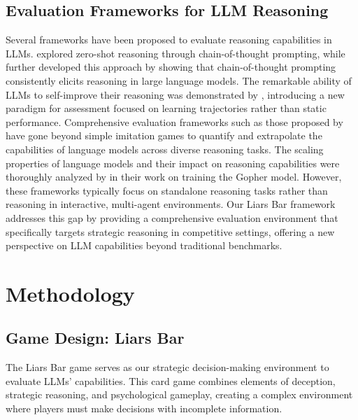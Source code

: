 \documentclass{article}
\begin{document}
\subsection{Evaluation Frameworks for LLM Reasoning}
Several frameworks have been proposed to evaluate reasoning capabilities in LLMs. \cite{kojima2022large} explored zero-shot reasoning through chain-of-thought prompting, while \cite{wei2022chain} further developed this approach by showing that chain-of-thought prompting consistently elicits reasoning in large language models. The remarkable ability of LLMs to self-improve their reasoning was demonstrated by \cite{huang2023large}, introducing a new paradigm for assessment focused on learning trajectories rather than static performance. Comprehensive evaluation frameworks such as those proposed by \cite{srivastava2022beyond} have gone beyond simple imitation games to quantify and extrapolate the capabilities of language models across diverse reasoning tasks. The scaling properties of language models and their impact on reasoning capabilities were thoroughly analyzed by \cite{rae2022scaling} in their work on training the Gopher model. However, these frameworks typically focus on standalone reasoning tasks rather than reasoning in interactive, multi-agent environments. Our Liars Bar framework addresses this gap by providing a comprehensive evaluation environment that specifically targets strategic reasoning in competitive settings, offering a new perspective on LLM capabilities beyond traditional benchmarks.

\section{Methodology}
\subsection{Game Design: Liars Bar}
The Liars Bar game serves as our strategic decision-making environment to evaluate LLMs' capabilities. This card game combines elements of deception, strategic reasoning, and psychological gameplay, creating a complex environment where players must make decisions with incomplete information.
\end{document}
